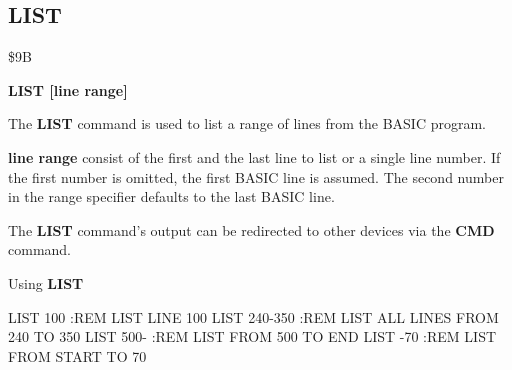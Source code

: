 \subsection{LIST}
\begin{description}[leftmargin=3cm,style=nextline]
\item [Token:] \$9B
\item [Format:] {\bf LIST [line range]} \\
\item [Usage:] The {\bf LIST} command is used to list
               a range of lines from the BASIC program.

               {\bf line range} consist of the first and the last
               line to list or a single line number.
               If the first number is omitted, the
               first BASIC line is assumed.
               The second number in the range specifier defaults
               to the last BASIC line.

\item [Remarks:] The {\bf LIST} command's output can be redirected
                 to other devices via the {\bf CMD} command.

\item [Example:] Using {\bf LIST}
\begin{screenoutput}
  LIST 100      :REM LIST LINE 100
  LIST 240-350  :REM LIST ALL LINES FROM 240 TO 350
  LIST 500-     :REM LIST FROM 500 TO END
  LIST -70      :REM LIST FROM START TO 70
\end{screenoutput}
\end{description}


\newpage
